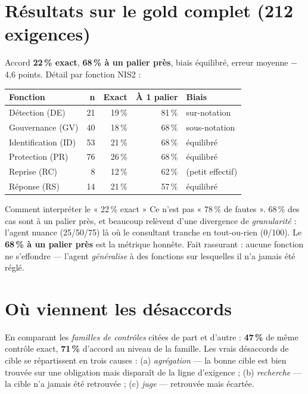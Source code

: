 \documentclass[11pt,a4paper]{report}
\begin{document}
\section{Résultats sur le gold complet (212 exigences)}
Accord \textbf{22\,\% exact}, \textbf{68\,\% à un palier près}, biais équilibré, erreur moyenne $-$4,6 points. Détail par fonction NIS2 :
\begin{center}\begin{tabular}{@{}lrrrl@{}}
\toprule \textbf{Fonction} & \textbf{n} & \textbf{Exact} & \textbf{À 1 palier} & \textbf{Biais}\\ \midrule
Détection (DE) & 21 & 19\,\% & 81\,\% & sur-notation\\
Gouvernance (GV) & 40 & 18\,\% & 68\,\% & sous-notation\\
Identification (ID) & 53 & 21\,\% & 68\,\% & équilibré\\
Protection (PR) & 76 & 26\,\% & 68\,\% & équilibré\\
Reprise (RC) & 8 & 12\,\% & 62\,\% & (petit effectif)\\
Réponse (RS) & 14 & 21\,\% & 57\,\% & équilibré\\
\bottomrule
\end{tabular}\end{center}

\begin{keybox}{Comment interpréter le « 22\,\% exact »}
Ce n'est pas « 78\,\% de fautes ». 68\,\% des cas sont à un palier près, et beaucoup relèvent d'une divergence de \emph{granularité} : l'agent nuance (25/50/75) là où le consultant tranche en tout-ou-rien (0/100). Le \textbf{68\,\% à un palier près} est la métrique honnête. Fait rassurant : aucune fonction ne s'effondre --- l'agent \emph{généralise} à des fonctions sur lesquelles il n'a jamais été réglé.
\end{keybox}

\section{Où viennent les désaccords}
En comparant les \emph{familles de contrôles} citées de part et d'autre : \textbf{47\,\%} de même contrôle exact, \textbf{71\,\%} d'accord au niveau de la famille. Les vrais désaccords de cible se répartissent en trois causes : (a) \emph{agrégation} --- la bonne cible est bien trouvée sur une obligation mais disparaît de la ligne d'exigence ; (b) \emph{recherche} --- la cible n'a jamais été retrouvée ; (c) \emph{juge} --- retrouvée mais écartée.
\end{document}
